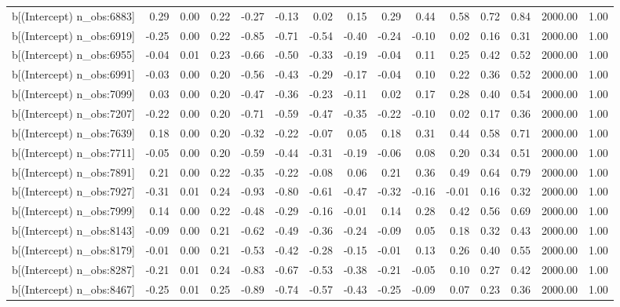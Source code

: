 \begin{table}[ht]
\begin{tabular}{rrrrrrrrrrrrrrr}
  b[(Intercept) n\_obs:6883] & 0.29 & 0.00 & 0.22 & -0.27 & -0.13 & 0.02 & 0.15 & 0.29 & 0.44 & 0.58 & 0.72 & 0.84 & 2000.00 & 1.00 \\ 
  b[(Intercept) n\_obs:6919] & -0.25 & 0.00 & 0.22 & -0.85 & -0.71 & -0.54 & -0.40 & -0.24 & -0.10 & 0.02 & 0.16 & 0.31 & 2000.00 & 1.00 \\ 
  b[(Intercept) n\_obs:6955] & -0.04 & 0.01 & 0.23 & -0.66 & -0.50 & -0.33 & -0.19 & -0.04 & 0.11 & 0.25 & 0.42 & 0.52 & 2000.00 & 1.00 \\ 
  b[(Intercept) n\_obs:6991] & -0.03 & 0.00 & 0.20 & -0.56 & -0.43 & -0.29 & -0.17 & -0.04 & 0.10 & 0.22 & 0.36 & 0.52 & 2000.00 & 1.00 \\ 
  b[(Intercept) n\_obs:7099] & 0.03 & 0.00 & 0.20 & -0.47 & -0.36 & -0.23 & -0.11 & 0.02 & 0.17 & 0.28 & 0.40 & 0.54 & 2000.00 & 1.00 \\ 
  b[(Intercept) n\_obs:7207] & -0.22 & 0.00 & 0.20 & -0.71 & -0.59 & -0.47 & -0.35 & -0.22 & -0.10 & 0.02 & 0.17 & 0.36 & 2000.00 & 1.00 \\ 
  b[(Intercept) n\_obs:7639] & 0.18 & 0.00 & 0.20 & -0.32 & -0.22 & -0.07 & 0.05 & 0.18 & 0.31 & 0.44 & 0.58 & 0.71 & 2000.00 & 1.00 \\ 
  b[(Intercept) n\_obs:7711] & -0.05 & 0.00 & 0.20 & -0.59 & -0.44 & -0.31 & -0.19 & -0.06 & 0.08 & 0.20 & 0.34 & 0.51 & 2000.00 & 1.00 \\ 
  b[(Intercept) n\_obs:7891] & 0.21 & 0.00 & 0.22 & -0.35 & -0.22 & -0.08 & 0.06 & 0.21 & 0.36 & 0.49 & 0.64 & 0.79 & 2000.00 & 1.00 \\ 
  b[(Intercept) n\_obs:7927] & -0.31 & 0.01 & 0.24 & -0.93 & -0.80 & -0.61 & -0.47 & -0.32 & -0.16 & -0.01 & 0.16 & 0.32 & 2000.00 & 1.00 \\ 
  b[(Intercept) n\_obs:7999] & 0.14 & 0.00 & 0.22 & -0.48 & -0.29 & -0.16 & -0.01 & 0.14 & 0.28 & 0.42 & 0.56 & 0.69 & 2000.00 & 1.00 \\ 
  b[(Intercept) n\_obs:8143] & -0.09 & 0.00 & 0.21 & -0.62 & -0.49 & -0.36 & -0.24 & -0.09 & 0.05 & 0.18 & 0.32 & 0.43 & 2000.00 & 1.00 \\ 
  b[(Intercept) n\_obs:8179] & -0.01 & 0.00 & 0.21 & -0.53 & -0.42 & -0.28 & -0.15 & -0.01 & 0.13 & 0.26 & 0.40 & 0.55 & 2000.00 & 1.00 \\ 
  b[(Intercept) n\_obs:8287] & -0.21 & 0.01 & 0.24 & -0.83 & -0.67 & -0.53 & -0.38 & -0.21 & -0.05 & 0.10 & 0.27 & 0.42 & 2000.00 & 1.00 \\ 
  b[(Intercept) n\_obs:8467] & -0.25 & 0.01 & 0.25 & -0.89 & -0.74 & -0.57 & -0.43 & -0.25 & -0.09 & 0.07 & 0.23 & 0.36 & 2000.00 & 1.00 \\ 

\end{tabular}
\end{table}

